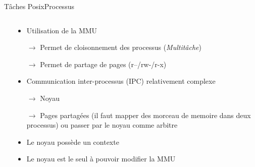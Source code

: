 \begin{frame}{Tâches Posix}{Processus}
  \begin{columns}
    \begin{column}{3.5cm}
   \end{column}
   \begin{column}{6.5cm}
     \begin{itemize}
     \item Utilisation de la MMU
     \item[$\to$]    Permet    de    cloisonnement    des    processus
       (\emph{Multitâche})
     \item[$\to$] Permet de partage de pages (r--/rw-/r-x)
     \item Communication inter-processus (IPC) relativement complexe
     \item[$\to$] Noyau
     \item[$\to$] Pages partagées
       \note[item]({il faut mapper des morceau de memoire dans deux processus) ou passer par le noyau comme arbitre}
     \item Le noyau possède un contexte
     \item Le noyau est le seul à pouvoir modifier la MMU
     \end{itemize}
   \end{column}
  \end{columns}
\end{frame}


